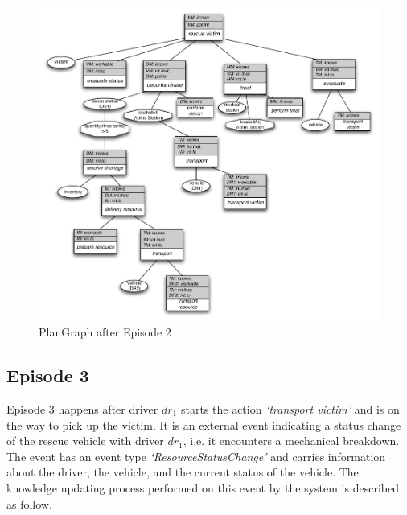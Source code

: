 \begin{figure}[htbp] %
	\centering
	\includegraphics[width=5.8in]{plangraph_ep2.pdf} 
	\caption{PlanGraph after Episode 2}
	\label{fig:plangraph_ep2}
\end{figure}

\subsection{Episode 3} %
\label{sub:episode_3}
Episode 3 happens after driver $dr_1$ starts the action \emph{`transport victim'} and is on the way to pick up the victim. It is an external event indicating a status change of the rescue vehicle with driver $dr_1$, i.e. it encounters a mechanical breakdown. The event has an event type \emph{`ResourceStatusChange'} and carries information about the driver, the vehicle, and the current status of the vehicle. The knowledge updating process performed on this event by the system is described as follow.

